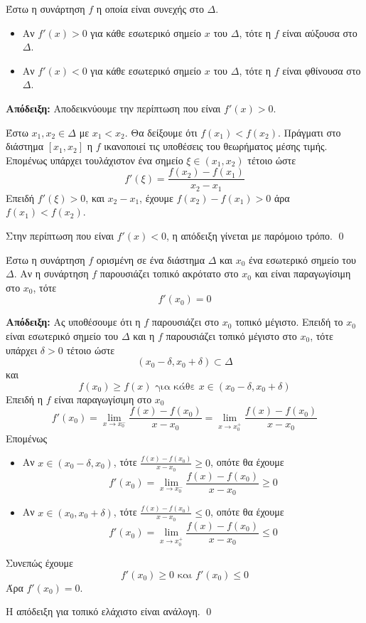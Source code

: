 \documentclass[a4paper, 12pt]{article}
\renewenvironment{proof}[1][\textbf{Απόδειξη}]{%
  \par\noindent\textbf{#1:} \rmfamily}{\qed\par}
\begin{document}
\begin{theorem}{}
  Έστω η συνάρτηση $f$ η οποία είναι συνεχής στο $Δ$.
  \begin{itemize}
    \item Αν $f'(x)>0$ για κάθε εσωτερικό σημείο $x$ του $Δ$, τότε η $f$ είναι αύξουσα στο $Δ$.
    \item Αν $f'(x)<0$ για κάθε εσωτερικό σημείο $x$ του $Δ$, τότε η $f$ είναι φθίνουσα στο $Δ$.
  \end{itemize}
\end{theorem}
\begin{proof}
  Αποδεικνύουμε την περίπτωση που είναι $f'(x)>0$.

  Έστω $x_1,x_2\in Δ$ με $x_1<x_2$. Θα δείξουμε ότι $f(x_1)<f(x_2)$. Πράγματι στο διάστημα $[x_1, x_2]$ η $f$ ικανοποιεί τις υποθέσεις του θεωρήματος μέσης τιμής. Επομένως υπάρχει τουλάχιστον ένα σημείο $ξ\in (x_1,x_2)$ τέτοιο ώστε
  $$f'(ξ)=\frac{f(x_2)-f(x_1)}{x_2-x_1}$$
  Επειδή $f'(ξ)>0$, και $x_2-x_1$, έχουμε $f(x_2)-f(x_1)>0$ άρα $f(x_1)<f(x_2)$.

  Στην περίπτωση που είναι  $f'(x)<0$, η απόδειξη γίνεται με παρόμοιο τρόπο.
\end{proof}

\begin{theorem}{}
  Έστω η συνάρτηση $f$ ορισμένη σε ένα διάστημα $Δ$ και $x_0$ ένα εσωτερικό σημείο του $Δ$. Αν η συνάρτηση $f$ παρουσιάζει τοπικό ακρότατο στο $x_0$ και είναι παραγωγίσιμη στο $x_0$, τότε
  $$f'(x_0)=0$$
\end{theorem}
\begin{proof}
  Ας υποθέσουμε ότι η $f$ παρουσιάζει στο $x_0$ τοπικό μέγιστο.
  Επειδή το $x_0$ είναι εσωτερικό σημείο του $Δ$ και η $f$ παρουσιάζει τοπικό μέγιστο στο $x_0$, τότε υπάρχει $δ>0$ τέτοιο ώστε
  $$(x_0-δ,x_0+δ)\subset Δ$$
  και
  $$f(x_0)\geq f(x) \text{ για κάθε } x\in (x_0-δ,x_0+δ)$$
  Επειδή η $f$ είναι παραγωγίσιμη στο $x_0$
  $$f'(x_0)=\lim_{x\to x_0^-} \dfrac{f(x)-f(x_0)}{x-x_0}=\lim_{x\to x_0^+} \dfrac{f(x)-f(x_0)}{x-x_0}$$
  Επομένως
  \begin{itemize}
    \item Αν $x\in (x_0-δ,x_0)$, τότε $\frac{f(x)-f(x_0)}{x-x_0}\geq 0$, οπότε θα έχουμε
          $$f'(x_0)=\lim_{x\to x_0^-} \frac{f(x)-f(x_0)}{x-x_0}\geq 0$$
    \item Αν $x\in (x_0,x_0+δ)$, τότε $\frac{f(x)-f(x_0)}{x-x_0}\leq 0$, οπότε θα έχουμε
          $$f'(x_0)=\lim_{x\to x_0^+} \frac{f(x)-f(x_0)}{x-x_0}\leq 0$$
  \end{itemize}
  Συνεπώς έχουμε
  $$f'(x_0)\geq 0 \text{ και } f'(x_0)\leq 0$$
  Άρα $f'(x_0)=0$.

  Η απόδειξη για τοπικό ελάχιστο είναι ανάλογη.
\end{proof}
\end{document}
